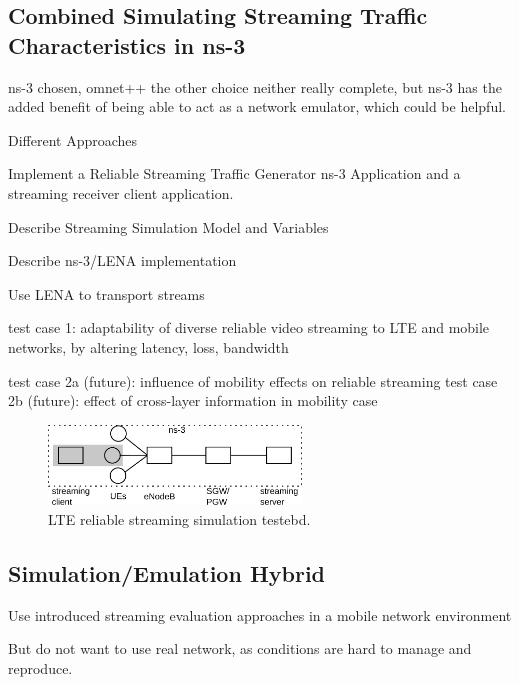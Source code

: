 
\subsection{Combined Simulating Streaming Traffic Characteristics in ns-3}

ns-3 chosen, omnet++ the other choice
neither really complete, but ns-3 has the added benefit of being able to act as a network emulator, which could be helpful.


Different Approaches



Implement a Reliable Streaming Traffic Generator ns-3 Application and a streaming receiver client application.

Describe Streaming Simulation Model and Variables

Describe ns-3/LENA implementation

 Use LENA to transport streams


 test case 1: adaptability of diverse reliable video streaming to LTE and mobile networks, by altering latency, loss, bandwidth

 test case 2a (future): influence of mobility effects on reliable streaming
 test case 2b (future): effect of cross-layer information in mobility case



\begin{figure}[htb]
\centering
\includegraphics[width=0.6\textwidth]{images/streaming-simulation.pdf}
\caption{\gls{LTE} reliable streaming simulation testebd.}
\label{c5:fig:streaming-simulation}
\end{figure}


\subsection{Simulation/Emulation Hybrid}


Use introduced streaming evaluation approaches in a mobile network environment

But do not want to use real network, as conditions are hard to manage and reproduce.

